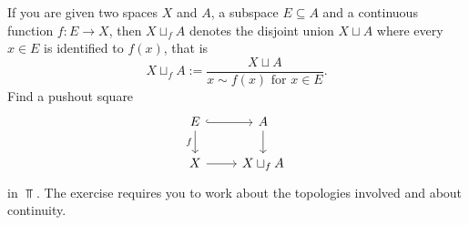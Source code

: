 
\begin{exercise}
If you are given two spaces \(X\) and \(A\), a subspace \(E \subseteq A\) and a continuous function \(f : E \to X\), then \(X \sqcup_f A\) denotes the disjoint union \(X \sqcup A\) where every \(x \in E\) is identified to \(f(x)\), that is%
\[X \sqcup_f A := \frac{X \sqcup A}{x \sim f(x) \text{ for } x \in E} .\]
Find a pushout square
\[\begin{tikzcd}
E \ar[r, hookrightarrow] \ar["f", d, swap] & A \ar[d]     \\
X \ar[r]                                   & X \sqcup_f A
\end{tikzcd}\]
in \(\Top\). The exercise requires you to work about the topologies involved and about continuity.
\end{exercise}

